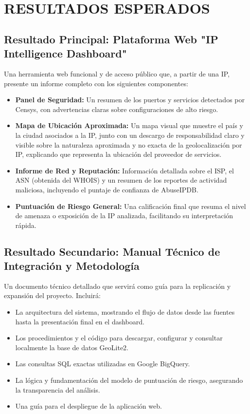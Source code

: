 \section{RESULTADOS ESPERADOS}

\subsection{Resultado Principal: Plataforma Web "IP Intelligence Dashboard"}
Una herramienta web funcional y de acceso público que, a partir de una IP, presente un informe completo con los siguientes componentes:

\begin{itemize}
    \item \textbf{Panel de Seguridad:} Un resumen de los puertos y servicios detectados por Censys, con advertencias claras sobre configuraciones de alto riesgo.
    \item \textbf{Mapa de Ubicación Aproximada:} Un mapa visual que muestre el país y la ciudad asociados a la IP, junto con un descargo de responsabilidad claro y visible sobre la naturaleza aproximada y no exacta de la geolocalización por IP, explicando que representa la ubicación del proveedor de servicios.
    \item \textbf{Informe de Red y Reputación:} Información detallada sobre el ISP, el ASN (obtenida del WHOIS) y un resumen de los reportes de actividad maliciosa, incluyendo el puntaje de confianza de AbuseIPDB.
    \item \textbf{Puntuación de Riesgo General:} Una calificación final que resuma el nivel de amenaza o exposición de la IP analizada, facilitando su interpretación rápida.
\end{itemize}

\subsection{Resultado Secundario: Manual Técnico de Integración y Metodología}
Un documento técnico detallado que servirá como guía para la replicación y expansión del proyecto. Incluirá:

\begin{itemize}
    \item La arquitectura del sistema, mostrando el flujo de datos desde las fuentes hasta la presentación final en el dashboard.
    \item Los procedimientos y el código para descargar, configurar y consultar localmente la base de datos GeoLite2.
    \item Las consultas SQL exactas utilizadas en Google BigQuery.
    \item La lógica y fundamentación del modelo de puntuación de riesgo, asegurando la transparencia del análisis.
    \item Una guía para el despliegue de la aplicación web.
\end{itemize}
